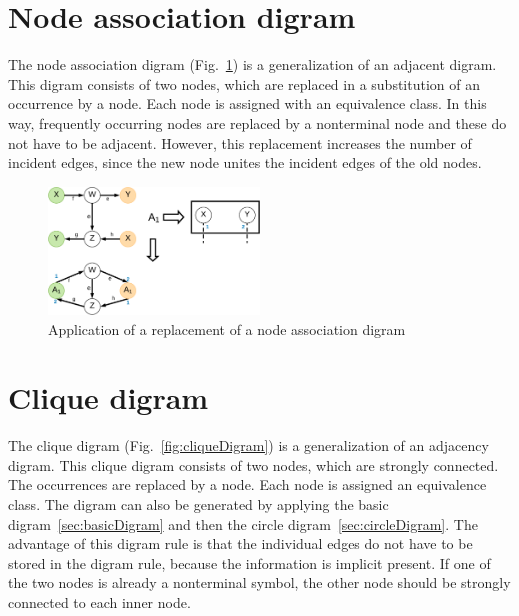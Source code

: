 \documentclass[a4paper]{scrartcl}
\begin{document}
\section{Node association digram}
\label{sec:associationDigram}


The node association digram (Fig.~\ref{fig:nodeAssociationDigram}) is a generalization of an adjacent digram.
This digram consists of two nodes, which are replaced in a substitution of an occurrence by a node. Each node is assigned with an equivalence class.
In this way, frequently occurring nodes are replaced by a nonterminal node and these do not have to be adjacent. However, this replacement increases the number of incident edges, since the new node unites the incident edges of the old nodes.

\begin{figure}[h]
	\centering
	\includegraphics[width=0.5\textwidth]{img/nodeAssociationDigram}
	\caption{Application of a replacement of a node association digram}
	\label{fig:nodeAssociationDigram}
\end{figure}


\section{Clique digram}
\label{sec:cliqueDigram}


The clique digram (Fig.~\ref{fig:cliqueDigram}) is a generalization of an adjacency digram.
This clique digram consists of two nodes, which are strongly connected. The occurrences are replaced by a node. Each node is assigned an equivalence class. The digram can also be generated by applying the basic digram~\ref{sec:basicDigram} and then the circle digram~\ref{sec:circleDigram}. The advantage of this digram rule is that the individual edges do not have to be stored in the digram rule, because the information is implicit present. If one of the two nodes is already a nonterminal symbol, the other node should be strongly connected to each inner node. 
\end{document}
